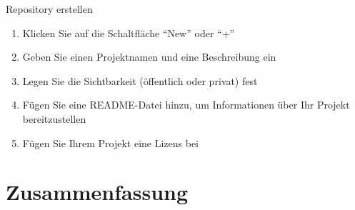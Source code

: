 \documentclass[compress,aspectratio=169]{beamer}
\begin{document}
	\begin{frame}{Repository erstellen}
		\begin{enumerate}
			\item Klicken Sie auf die Schaltfläche ``New'' oder ``+''
			\item Geben Sie einen Projektnamen und eine Beschreibung ein
			\item Legen Sie die Sichtbarkeit (öffentlich oder privat) fest
			\item Fügen Sie eine README-Datei hinzu, um Informationen über Ihr Projekt bereitzustellen
			\item Fügen Sie Ihrem Projekt eine Lizens bei
		\end{enumerate}
	\end{frame}


	\section{Zusammenfassung}
\end{document}
